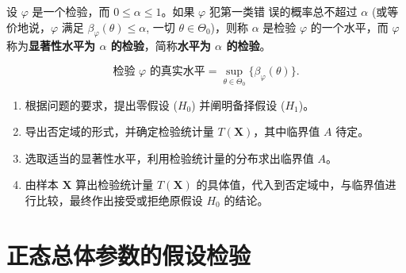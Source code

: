 \begin{definition}[检验的水平与真实水平]\label{def:test_level_and_size}
设 $\varphi$ 是一个检验，而 $0 \le \alpha \le 1$。如果 $\varphi$ 犯第一类错
误的概率总不超过 $\alpha$ (或等价地说，$\varphi$ 满足 $\beta_\varphi(\theta) \le \alpha$, 一切 $\theta \in \Theta_0$)，则称 $\alpha$ 是检验
$\varphi$ 的一个水平，而 $\varphi$ 称为\textbf{显著性水平为 $\alpha$ 的检验}，简称\textbf{水平为 $\alpha$ 的检验}。

\begin{equation}
    \text{检验 }\varphi\text{ 的真实水平} = \sup_{\theta \in \Theta_0} \{\beta_\varphi(\theta)\}. \label{eq:true_level}
\end{equation}

\end{definition}
\begin{proposition}[假设检验的通用步骤]\label{prop:假设检验的通用步骤}
\begin{enumerate}
    \item 根据问题的要求，提出零假设 ($H_0$) 并阐明备择假设 ($H_1$)。
    \item 导出否定域的形式，并确定检验统计量 $T(\mathbf{X})$，其中临界值 $A$ 待定。
    \item 选取适当的显著性水平，利用检验统计量的分布求出临界值 $A$。
    \item 由样本 $\mathbf{X}$ 算出检验统计量 $T(\mathbf{X})$ 的具体值，代入到否定域中，与临界值进行比较，最终作出接受或拒绝原假设 $H_0$ 的结论。
\end{enumerate}
\end{proposition}


\section{正态总体参数的假设检验}\label{sec:正态总体参数的假设检验}
